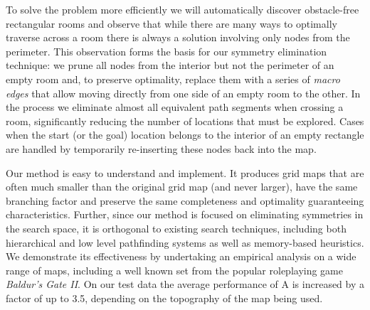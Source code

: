 To solve the problem more efficiently we will automatically discover obstacle-free rectangular rooms and 
observe that while there are many ways to optimally traverse across a room there is always a solution 
involving only nodes from the perimeter.
This observation forms the basis for our symmetry elimination technique: we prune all nodes from the interior
but not the perimeter of an empty room and, to preserve optimality,
replace them with a series of \emph{macro edges} that allow
moving directly from one side of an empty room to the other. 
In the process we eliminate almost all equivalent path segments when crossing a room,
significantly reducing the number of locations that must be explored.
Cases when the start (or the goal) location belongs to the interior of an empty rectangle are handled by
temporarily re-inserting these nodes back into the map.
\par
Our method is easy to understand and implement.
It produces grid maps that are often much smaller than the original grid map
(and never larger), have the same branching factor and preserve the same completeness and optimality 
guaranteeing characteristics.
Further, since our method is focused on eliminating symmetries in the search space, it is orthogonal to existing 
search techniques, including both hierarchical and low level pathfinding systems as well as memory-based heuristics.
We demonstrate its effectiveness by undertaking an empirical analysis on a wide range of maps, 
including a well known set from the popular roleplaying game \emph{Baldur's Gate II}. 
On our test data the average performance of A\* is increased by a factor of up to 3.5, depending on the 
topography of the map being used.



